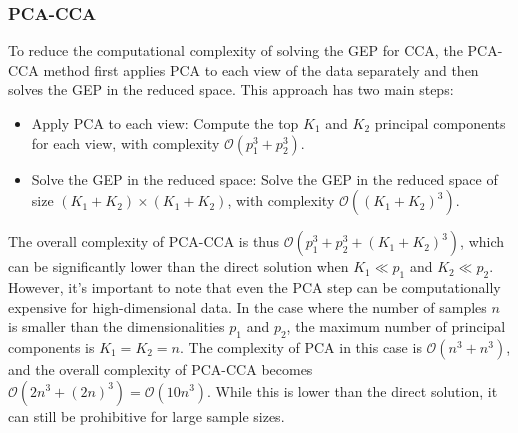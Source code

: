 \subsubsection{PCA-CCA}
To reduce the computational complexity of solving the GEP for CCA, the PCA-CCA method first applies PCA to each view of the data separately and then solves the GEP in the reduced space. This approach has two main steps:

\begin{itemize}
    \item Apply PCA to each view: Compute the top $K_1$ and $K_2$ principal components for each view, with complexity $\mathcal{O}(p_1^3 + p_2^3)$.
    \item Solve the GEP in the reduced space: Solve the GEP in the reduced space of size $(K_1 + K_2) \times (K_1 + K_2)$, with complexity $\mathcal{O}((K_1 + K_2)^3)$.
\end{itemize}

The overall complexity of PCA-CCA is thus $\mathcal{O}(p_1^3 + p_2^3 + (K_1 + K_2)^3)$, which can be significantly lower than the direct solution when $K_1 \ll p_1$ and $K_2 \ll p_2$.
However, it's important to note that even the PCA step can be computationally expensive for high-dimensional data. In the case where the number of samples $n$ is smaller than the dimensionalities $p_1$ and $p_2$, the maximum number of principal components is $K_1 = K_2 = n$. The complexity of PCA in this case is $\mathcal{O}(n^3 + n^3)$, and the overall complexity of PCA-CCA becomes $\mathcal{O}(2n^3 + (2n)^3) = \mathcal{O}(10n^3)$. While this is lower than the direct solution, it can still be prohibitive for large sample sizes.
